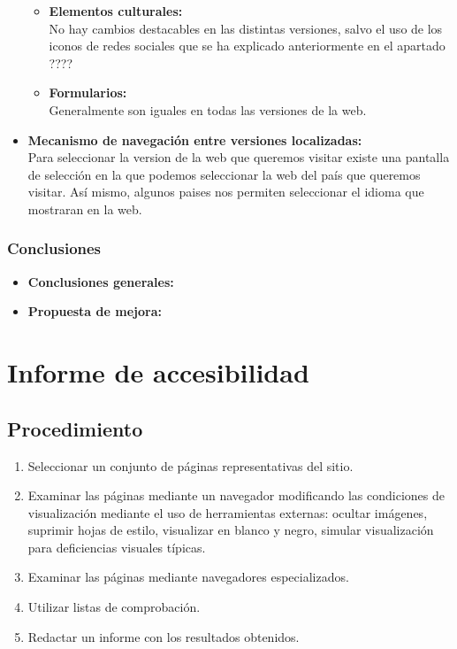 \documentclass[a4paper,11pt]{article}
\begin{document}
\begin{itemize}
\begin{itemize}
  \item \textbf{Elementos culturales:}\\
  No hay cambios destacables en las distintas versiones, salvo el uso de los iconos de redes sociales que se ha explicado anteriormente en el apartado ????
  \item \textbf{Formularios:}\\
Generalmente son iguales en todas las versiones de la web.

\end{itemize}

\item \textbf{Mecanismo de navegación entre versiones localizadas:}\\
Para seleccionar la version de la web que queremos visitar existe una pantalla de selección en la que podemos seleccionar la web del país que queremos visitar. Así mismo, algunos paises nos permiten seleccionar el idioma que mostraran en la web.
\end{itemize}

\subsubsection{Conclusiones}
\begin{itemize}
\item \textbf{Conclusiones generales:}\\
\item \textbf{Propuesta de mejora:}\\

\end{itemize}

\section{Informe de accesibilidad}
\subsection{Procedimiento}
\begin{enumerate}
\item Seleccionar un conjunto de páginas representativas del sitio.
\item Examinar las páginas mediante un navegador modificando las condiciones de visualización mediante el uso de herramientas externas: ocultar imágenes, suprimir hojas de estilo, visualizar en blanco y negro, simular visualización para deficiencias visuales típicas.
\item Examinar las páginas mediante navegadores especializados.
\item Utilizar listas de comprobación.
\item Redactar un informe con los resultados obtenidos.
\end{enumerate}
\end{document}
